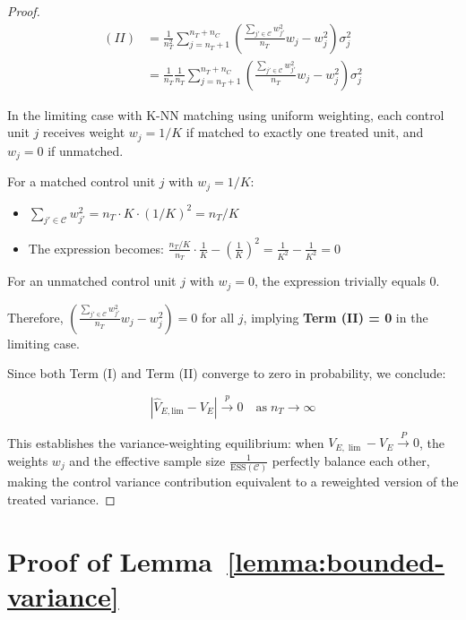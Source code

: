 \documentclass{mytemplate}
\begin{document}
\begin{proof}
$$
\begin{aligned}
(II)&=\frac{1}{n_T^2} \sum_{j=n_T+1}^{n_T+n_C}\left(\frac{\sum_{j' \in \mathcal{C}} w_{j'}^2}{n_T} w_j-w_j^2\right) \sigma_j^2 \\
&=\frac{1}{n_T} \frac{1}{n_T} \sum_{j=n_T+1}^{n_T+n_C}\left(\frac{\sum_{j' \in \mathcal{C}} w_{j'}^2}{n_T} w_j-w_j^2\right) \sigma_j^2
\end{aligned}
$$

In the limiting case with K-NN matching using uniform weighting, each control unit $j$ receives weight $w_j = 1/K$ if matched to exactly one treated unit, and $w_j = 0$ if unmatched. 

For a matched control unit $j$ with $w_j = 1/K$:
\begin{itemize}
\item $\sum_{j' \in \mathcal{C}} w_{j'}^2 = n_T \cdot K \cdot (1/K)^2 = n_T/K$
\item The expression becomes: $\frac{n_T/K}{n_T} \cdot \frac{1}{K} - \left(\frac{1}{K}\right)^2 = \frac{1}{K^2} - \frac{1}{K^2} = 0$
\end{itemize}

For an unmatched control unit $j$ with $w_j = 0$, the expression trivially equals 0.

Therefore, $\left(\frac{\sum_{j' \in \mathcal{C}} w_{j'}^2}{n_T} w_j-w_j^2\right) = 0$ for all $j$, implying \textbf{Term (II) = 0} in the limiting case.

Since both Term (I) and Term (II) converge to zero in probability, we conclude:

$$\left|\hat{V}_{E, \text{lim}}-V_E\right| \xrightarrow{p} 0 \quad \text{as} \; n_T \rightarrow \infty$$

This establishes the variance-weighting equilibrium: when $V_{E,\lim} - V_E \xrightarrow{P} 0$, the weights $w_j$ and the effective sample size $\frac{1}{\text{ESS}(\mathcal{C})}$ perfectly balance each other, making the control variance contribution equivalent to a reweighted version of the treated variance.

\end{proof}

\section{Proof of Lemma~\ref{lemma:bounded-variance}}
\label{sec:proof-lemma-bounded-variance}
\end{document}
